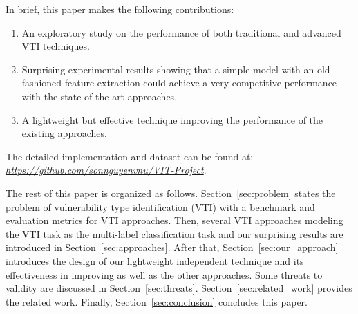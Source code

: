  In brief, this paper makes the following contributions:
\begin{enumerate}
    \item An exploratory study on the performance of both traditional and advanced VTI techniques.
    \item Surprising experimental results showing that a simple model with an old-fashioned feature extraction could achieve a very competitive performance with the state-of-the-art approaches.
    \item A lightweight but effective technique improving the performance of the existing approaches.
\end{enumerate}
%
The detailed implementation and dataset can be found at: \textit{\url{https://github.com/sonnguyenvnu/VIT-Project}}.


The rest of this paper is organized as follows. Section~\ref {sec:problem} states the problem of vulnerability type identification (VTI) with a benchmark and evaluation metrics for VTI approaches. Then, several VTI approaches modeling the VTI task as the multi-label classification task and our surprising results are introduced in Section~\ref{sec:approaches}. 
After that, Section~\ref{sec:our_approach} introduces the design of our lightweight independent technique and its effectiveness in improving \base as well as the other approaches. 
%
Some threats to validity are discussed in Section~\ref{sec:threats}.
%
Section~\ref{sec:related_work} provides the related work. Finally, Section~\ref{sec:conclusion} concludes this paper.